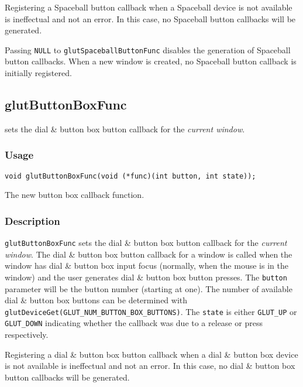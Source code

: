 Registering a Spaceball button callback when a Spaceball device is not available
is ineffectual and not an error.  In this case, no Spaceball button callbacks
will be generated.

Passing {\tt NULL} to {\tt glutSpaceballButtonFunc} disables the generation of
Spaceball button callbacks.  When a new window is created, no
Spaceball button callback is initially registered.

\subsection{glutButtonBoxFunc}

 sets the dial \& button box button callback for
the {\em current window}.

\subsubsection*{Usage}
\begin{verbatim}
void glutButtonBoxFunc(void (*func)(int button, int state));
\end{verbatim}
\begin{description}
\itemsep 0in
\item[{\tt func}]
The new button box callback function.
\end{description}

\subsubsection*{Description}

{\tt glutButtonBoxFunc} sets the dial \& button box button callback for the {\em
current window}.  The dial \& button box button callback for a window is called when the
window has dial \& button box input focus (normally, when the mouse is in the window)
and the user generates dial \& button box button presses.  The {\tt button} parameter
will be the button number (starting at one).  The number of available dial \&
button box
buttons can be determined with {\tt glutDeviceGet(GLUT\_NUM\_BUTTON\_BOX\_BUTTONS)}.
The {\tt state} is either {\tt GLUT\_UP} or {\tt GLUT\_DOWN} indicating whether
the callback was due to a release or press respectively.

Registering a dial \& button box button callback when a dial \& button box
device is not available
is ineffectual and not an error.  In this case, no dial \& button box button callbacks
will be generated.

